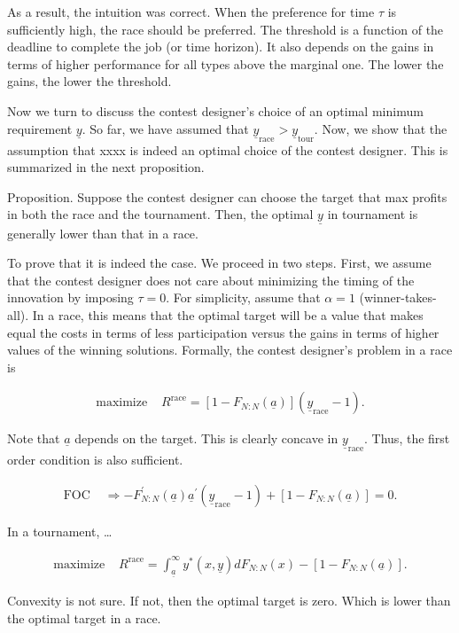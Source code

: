 \documentclass[12pt,]{article}
\newcommand\target{\underline{y}}
\newcommand\race{\text{race}}
\newcommand\tournament{\text{tour}}
\newcommand\mtype{\underline{a}}
\begin{document}
As a result, the intuition was correct. When the preference for time
\(\tau\) is sufficiently high, the race should be preferred. The
threshold is a function of the deadline to complete the job (or time
horizon). It also depends on the gains in terms of higher performance
for all types above the marginal one. The lower the gains, the lower the
threshold.

Now we turn to discuss the contest designer's choice of an optimal
minimum requirement \(\target\). So far, we have assumed that
\(\target_\race>\target_\tournament\). Now, we show that the assumption
that xxxx is indeed an optimal choice of the contest designer. This is
summarized in the next proposition.

Proposition. Suppose the contest designer can choose the target that max
profits in both the race and the tournament. Then, the optimal
\(\target\) in tournament is generally lower than that in a race.

To prove that it is indeed the case. We proceed in two steps. First, we
assume that the contest designer does not care about minimizing the
timing of the innovation by imposing \(\tau = 0\). For simplicity,
assume that \(\alpha=1\) (winner-takes-all). In a race, this means that
the optimal target will be a value that makes equal the costs in terms
of less participation versus the gains in terms of higher values of the
winning solutions. Formally, the contest designer's problem in a race is

\begin{align}
  \text{maximize } & R^\race = [1-F_{N:N}(\mtype)] (\target_\race - 1).
\end{align}

Note that \(\mtype\) depends on the target. This is clearly concave in
\(\target_\race\). Thus, the first order condition is also sufficient.

\begin{align}\label{foc race}
  \text{FOC } & \Rightarrow -F^\prime_{N:N}(\mtype) \mtype^\prime (\target_\race - 1) + [1-F_{N:N}(\mtype)] = 0.
\end{align}

In a tournament, \ldots{}

\begin{align}
  \text{maximize } & R^\race = \int_{\mtype}^\infty y^*(x, \target) d F_{N:N}(x) - [1-F_{N:N}(\mtype)]. 
\end{align}

Convexity is not sure. If not, then the optimal target is zero. Which is
lower than the optimal target in a race.
\end{document}
